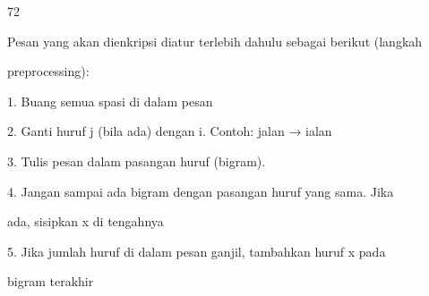 \documentclass{article}
\begin{document}

72

Pesan yang akan dienkripsi diatur terlebih dahulu sebagai berikut (langkah 

preprocessing):

1.  Buang semua spasi di dalam pesan

2.  Ganti huruf j (bila ada) dengan i. Contoh: jalan → ialan

3. Tulis pesan dalam pasangan huruf  (bigram).

4. Jangan sampai ada bigram dengan pasangan huruf yang sama. Jika  

ada, sisipkan  x di tengahnya

5. Jika jumlah huruf di dalam pesan ganjil, tambahkan  huruf x pada 

bigram terakhir
\end{document}

